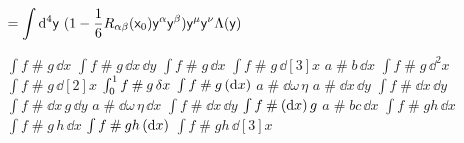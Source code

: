 \documentclass{article}
\begin{document}
$\displaystyle=\int\differential^{4}\mathsf{y}\ (1-\frac{1}{6}R_{\alpha\beta}(\mathsf{x}_{0})\mathsf{y}^{\alpha}\mathsf{y}^{\beta})\mathsf{y}^{\mu}\mathsf{y}^{\nu}\Lambda(\mathsf{y})$


$\int f\mathbin{\#}g\,\dd x$ $\int f\mathbin{\#}g\,\dd x\,\dd y$ $\int f\mathbin{\#}g\,\dd{x}$ $\int f\mathbin{\#}g\,\dd[3]{x}$
$a\mathbin{\#}b\,\dd x$ $\int f\mathbin{\#}g\,\dd^2 x$ $\int f\mathbin{\#}g\,\dd[2] x$ $\int_0^1 f\mathbin{\#}g\,\variation x$
$\int f\mathbin{\#}g\,\qty(\dd x)$ $a\mathbin{\#}\dd\omega\,\eta$ $a\mathbin{\#}\dd x\,\dd y$ $\int f\mathbin{\#}\dd x\,\dd y$
$\int f\mathbin{\#}\dd x\,g\,\dd y$ $a\mathbin{\#}\dd\omega\,\eta\,\dd x$ $\int f\mathbin{\#}\dd{x}\,\dd{y}$ $\int f\mathbin{\#}\qty(\dd x)\,g$
$a\mathbin{\#}b c\,\dd x$ $\int f\mathbin{\#}g h\,\dd x$ $\int f\mathbin{\#}g\,h\,\dd{x}$ $\int f\mathbin{\#}g h\,\qty(\dd x)$ $\int f\mathbin{\#}g h\,\dd[3]{x}$
\end{document}
